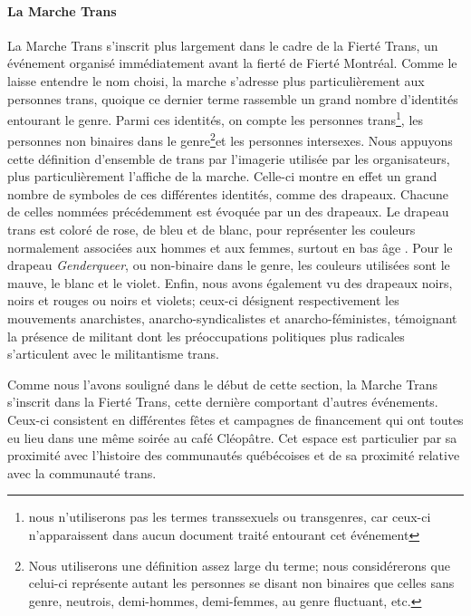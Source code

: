 \paragraph{La Marche Trans}
\label{subsubsec:marchetrans}
La Marche Trans s'inscrit plus largement dans le cadre de la Fierté Trans, un événement organisé immédiatement avant la fierté de Fierté Montréal.
Comme le laisse entendre le nom choisi, la marche s'adresse plus particulièrement aux personnes trans, quoique ce dernier terme rassemble un grand nombre d'identités entourant le genre.
Parmi ces identités, on compte les personnes trans\footnote{nous n'utiliserons pas les termes transsexuels ou transgenres, car ceux-ci n'apparaissent dans aucun document traité entourant cet événement}, les personnes non binaires dans le genre\footnote{Nous utiliserons une définition assez large du terme; nous considérerons que celui-ci représente autant les personnes se disant non binaires que celles sans genre, neutrois, demi-hommes, demi-femmes, au genre fluctuant, etc.\citep[see][]{Barker2015}}et les personnes intersexes.
Nous appuyons cette définition d'ensemble de trans par l'imagerie utilisée par les organisateurs, plus particulièrement l'affiche de la marche.
Celle-ci montre en effet un grand nombre de symboles de ces différentes identités, comme des drapeaux.
Chacune de celles nommées précédemment est évoquée par un des drapeaux.
Le drapeau trans est coloré de rose, de bleu et de blanc, pour représenter les couleurs normalement associées aux hommes et aux femmes, surtout en bas âge \citep[quoique, selon les biens de consommation, ces couleurs sont souvent utilisées, surtout pour les produits féminins; voir][]{Koller2008}.
Pour le drapeau \emph{Genderqueer}, ou non-binaire dans le genre, les couleurs utilisées sont le mauve, le blanc et le violet.
Enfin, nous avons également vu des drapeaux noirs, noirs et rouges ou noirs et violets; ceux-ci désignent respectivement les mouvements anarchistes, anarcho-syndicalistes et anarcho-féministes, témoignant la présence de militant dont les préoccupations politiques plus radicales s'articulent avec le militantisme trans.

Comme nous l'avons souligné dans le début de cette section, la Marche Trans s'inscrit dans la Fierté Trans, cette dernière comportant d'autres événements.
Ceux-ci consistent en différentes fêtes et campagnes de financement qui ont toutes eu lieu dans une même soirée au café Cléopâtre.
Cet espace est particulier par sa proximité avec l'histoire des communautés \lgbt{} québécoises et de sa proximité relative avec la communauté trans.

